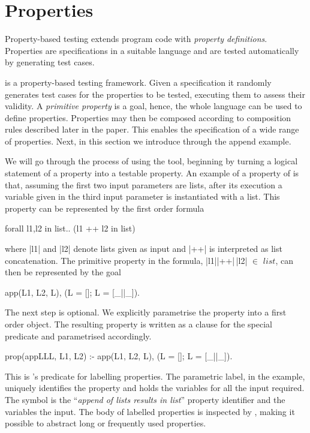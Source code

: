 



\section{Properties}
\label{sec:properties}

Property-based testing extends program code with {\em property definitions}.
%
Properties are specifications in a suitable language and are tested
automatically by generating test cases.



\plqc{} is a property-based testing framework.
%
Given a specification it randomly generates test cases for the
properties to be tested, executing them to assess their validity.
%
A \emph{primitive property} is a \Prolog{} goal, hence, the whole
language can be used to define properties.
%
Properties may then be composed according to composition rules described
later in the paper.
%
This enables the specification of a wide range of properties.
%
Next, in this section we introduce \plqc{} through the append example.



We will go through the process of using the tool, beginning by turning a logical
statement of a property into a \plqc{} testable property.
%
An example of a property of  is that, assuming the first two
input parameters are lists, after its execution a variable given in the third
input parameter is instantiated with a list.
%
This property can be represented by the first order formula
%
\begin{code}
     forall l1,l2 in list.. (l1 ++ l2 in list) 
\end{code}
where |l1| and |l2| denote  lists given as input and |++| is interpreted
as list concatenation. 
% 
The primitive property in the formula, |l1|{}|++|{}$\,$|l2| $\in$ $list$,  can
then be represented by the goal
\begin{yapcode}
  app(L1, L2, L), (L = []; L = [_||_]).
\end{yapcode}







The next step is optional.
%
We explicitly parametrise the property into a first order object.
%
The resulting property
is  written as a clause for the special
predicate  and parametrised accordingly.
%
\begin{yapcode}
 prop({appLLL, L1, L2}) :- app(L1, L2, L), (L = []; L = [_||_]).
\end{yapcode}
%
This is \plqc{}'s predicate for labelling properties.
%
The parametric label,  in the example, uniquely
identifies the property and holds the variables for all the input
required. 
%
The symbol  is the ``\emph{append of lists results in list}''
property identifier and the variables  the input.
%
The body of labelled properties is inspected by \plqc{},
making it possible to abstract long or
frequently used properties.


